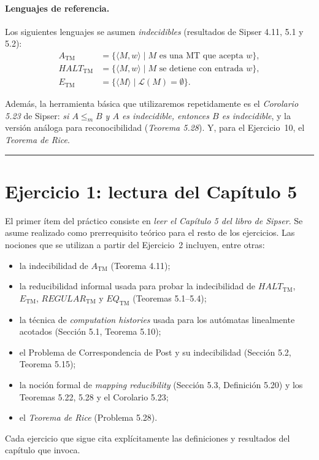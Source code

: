 \documentclass[11pt,a4paper]{article}
\theoremstyle{plain}
\theoremstyle{definition}
\theoremstyle{remark}
\newcommand{\TM}{\mathrm{TM}}
\newcommand{\enc}[1]{\langle #1\rangle}
\newcommand{\encMw}{\langle M, w\rangle}
\newcommand{\lang}{\mathcal{L}}
\newcommand{\redm}{\le_{m}}
\newcommand{\ATM}{A_{\TM}}
\newcommand{\HALT}{\mathit{HALT}_{\TM}}
\newcommand{\ETM}{E_{\TM}}
\newcommand{\EQTM}{\mathit{EQ}_{\TM}}
\begin{document}
\paragraph{Lenguajes de referencia.}
Los siguientes lenguajes se asumen \emph{indecidibles} (resultados de Sipser
4.11, 5.1 y 5.2):
\begin{align*}
  \ATM  &= \{\encMw \mid M \text{ es una MT que acepta } w\},\\
  \HALT &= \{\encMw \mid M \text{ se detiene con entrada } w\},\\
  \ETM  &= \{\enc{M} \mid \lang(M)=\emptyset\}.
\end{align*}

Adem\'as, la herramienta b\'asica que utilizaremos repetidamente es el
\emph{Corolario 5.23} de Sipser: \emph{si $A\redm B$ y $A$ es indecidible,
entonces $B$ es indecidible}, y la versi\'on an\'aloga para reconocibilidad
(\emph{Teorema 5.28}). Y, para el Ejercicio~10, el \emph{Teorema de Rice}.

\bigskip\hrule\bigskip

\section{Ejercicio 1: lectura del Cap\'itulo 5}
\label{sec:ej1}

El primer \'item del pr\'actico consiste en \emph{leer el Cap\'itulo 5 del
libro de Sipser}. Se asume realizado como prerrequisito te\'orico para el
resto de los ejercicios. Las nociones que se utilizan a partir del
Ejercicio~2 incluyen, entre otras:
\begin{itemize}
  \item la indecibilidad de $\ATM$ (Teorema 4.11);
  \item la reducibilidad informal usada para probar la indecibilidad de
        $\HALT$, $\ETM$, $\mathit{REGULAR}_{\TM}$ y $\EQTM$
        (Teoremas 5.1--5.4);
  \item la t\'ecnica de \emph{computation histories} usada para los aut\'omatas
        linealmente acotados (Secci\'on 5.1, Teorema 5.10);
  \item el Problema de Correspondencia de Post y su indecibilidad
        (Secci\'on 5.2, Teorema 5.15);
  \item la noci\'on formal de \emph{mapping reducibility} (Secci\'on 5.3,
        Definici\'on 5.20) y los Teoremas 5.22, 5.28 y el Corolario 5.23;
  \item el \emph{Teorema de Rice} (Problema 5.28).
\end{itemize}
Cada ejercicio que sigue cita expl\'icitamente las definiciones y resultados
del cap\'itulo que invoca.
\end{document}
